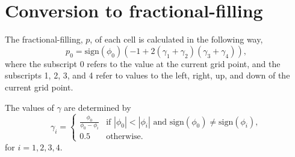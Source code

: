 \documentclass{article}
\begin{document}
\section{Conversion to fractional-filling}
The fractional-filling, $p$, of each cell is calculated in the following way,
\begin{equation}
    p_0 = \text{sign}(\phi_0)  (-1 + 2(\gamma_1 + \gamma_2)(\gamma_3 + \gamma_4)),
\end{equation}
where the subscript 0 refers to the value at the current grid point, and the subscripts 1, 2, 3, and 4 refer to values to the left, right, up, and down of the current grid point. 

The values of $\gamma$ are determined by
\begin{equation}
    \gamma_i = 
    \begin{cases}
        \frac{\phi_0}{\phi_0 - \phi_i} & 
            \text{if } |\phi_0| < |\phi_i| \text{ and } 
            \text{sign}(\phi_0) \ne \text{sign}(\phi_i), \\
        0.5 & \text{otherwise}.
    \end{cases}
\end{equation}
for $i = 1,2,3,4$.
\end{document}
